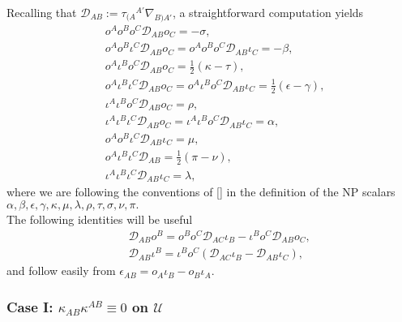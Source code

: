\documentclass[10pt,a4paper]{article}
\theoremstyle{plain}
\begin{document}
Recalling that $\mathcal{D}_{AB}:= \tau_{(A}{}^{A'}\nabla_{B)A'}$, a straightforward computation yields 
\begin{align*}
& o^Ao^Bo^C\mathcal{D}_{AB}o_C = -\sigma,\\
& o^Ao^B\iota^C\mathcal{D}_{AB}o_C=o^Ao^Bo^C\mathcal{D}_{AB}\iota_C=-\beta,\\
& o^A\iota^B o^C\mathcal{D}_{AB}o_C = \tfrac{1}{2}(\kappa - \tau),\\
& o^A\iota^B\iota^C\mathcal{D}_{AB}o_C = o^A\iota^B o^C\mathcal{D}_{AB}\iota_C = \tfrac{1}{2}(\epsilon - \gamma),\\
& \iota^A\iota^B o^C\mathcal{D}_{AB}o_C = \rho,\\
& \iota^A\iota^B\iota^C\mathcal{D}_{AB}o_C = \iota^A\iota^B o^C\mathcal{D}_{AB}\iota_C = \alpha,\\
& o^A o^B\iota^C\mathcal{D}_{AB}\iota_C = \mu,\\
& o^A\iota^B\iota^C\mathcal{D}_{AB} = \tfrac{1}{2}(\pi - \nu),\\
& \iota^A\iota^B\iota^C\mathcal{D}_{AB}\iota_C = \lambda	,
\end{align*}
where we are following the conventions of [] in the definition of the NP scalars $\alpha, \beta, \epsilon, \gamma, \kappa, \mu, 
\lambda, \rho, \tau, \sigma, \nu, \pi.$
\\

The following identities will be useful
\begin{subequations}
\begin{eqnarray}
&& \mathcal{D}_{AB}o^B = o^Bo^C\mathcal{D}_{AC}\iota_B - \iota^B o^C\mathcal{D}_{AB}o_C,\\
&& \mathcal{D}_{AB}\iota^B = \iota^B o^C(\mathcal{D}_{AC}\iota_B - \mathcal{D}_{AB}\iota_C),
\end{eqnarray}
\end{subequations}
and follow easily from $\epsilon_{AB}=o_A\iota_B - o_B\iota_A$. 

\subsubsection{Case I: $\kappa_{AB}\kappa^{AB}\equiv 0$ on $\mathcal{U}$} \label{TypeNCase}
\end{document}
